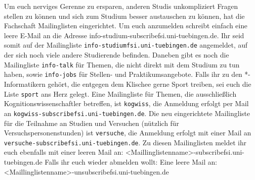 Um euch nerviges Gerenne zu ersparen, anderen Studis unkompliziert Fragen stellen zu können und
sich zum Studium besser austauschen zu können, hat die Fachschaft Mailinglisten eingerichtet. Um
euch anzumelden schreibt einfach eine leere E-Mail an die Adresse {\ttfamily info-studium-subscribe\At fsi.uni-tuebingen.de}.
Ihr seid somit auf der Mailingliste \texttt{info-studium\At fsi.\-uni-tuebingen.de} angemeldet, auf der sich noch
viele andere Studierende befinden.
Daneben gibt es noch die Mailingliste \texttt{info-talk} für Themen, die nicht direkt mit dem Studium
zu tun haben, sowie  \texttt{info-jobs} für Stellen- und Praktikumsangebote.
Falls ihr zu den *-Informatikern gehört, die entgegen dem Klischee gerne Sport treiben, sei euch die Liste \texttt{sport} ans Herz gelegt.
\ifkogwiss 
Eine Mailingliste für Themen, die ausschließlich Kognitionswissenschaftler betreffen, ist
\texttt{kogwiss}, die Anmeldung erfolgt per Mail an \texttt{kogwiss-subscribe\At fsi.uni-tuebingen.de}. 
Die neu eingerichtete Mailingliste für die Teilnahme an Studien und Versuchen (nützlich für Versuchspersonenstunden) ist \texttt{versuche}, 
die Anmeldung erfolgt mit einer Mail an \texttt{versuche-subscribe\At fsi.uni-tuebingen.de}.
\fi
Zu diesen Mailinglisten meldet ihr euch ebenfalls mit einer leeren Mail an: {\ttfamily <Maillinglistenname>-subscribe\At fsi.uni-tuebingen.de}
Falls ihr euch wieder abmelden wollt: Eine leere Mail an: 
{\ttfamily <Maillinglistenname>-unsubscribe\At fsi.uni-tuebingen.de}
